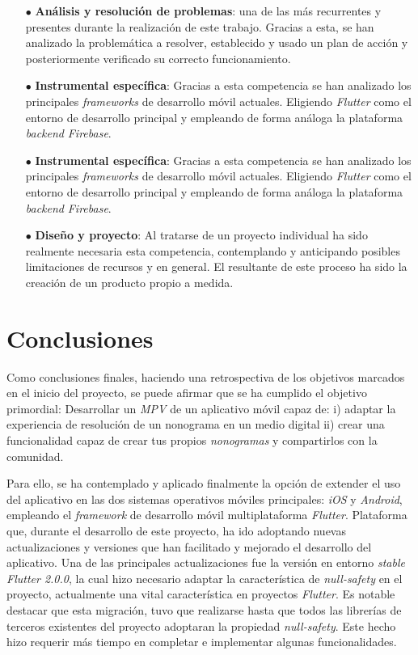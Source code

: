 \begin{itemize}
    \item[$\bullet$] \textbf{Análisis y resolución de problemas}: una de las
    más recurrentes y presentes durante la realización de este trabajo. Gracias a esta, se han
    analizado la problemática a resolver, establecido y usado un plan de acción y posteriormente
    verificado su correcto funcionamiento.
    \item[$\bullet$] \textbf{Instrumental específica}: Gracias a esta competencia
    se han analizado los principales \textit{frameworks} de desarrollo móvil actuales. 
    Eligiendo \textit{Flutter} como el entorno de desarrollo principal y empleando de forma
    análoga la plataforma \textit{back\-end} \textit{Firebase}.
    \item[$\bullet$] \textbf{Instrumental específica}: Gracias a esta competencia
    se han analizado los principales \textit{frameworks} de desarrollo móvil actuales. 
    Eligiendo \textit{Flutter} como el entorno de desarrollo principal y empleando de forma
    análoga la plataforma \textit{back\-end} \textit{Firebase}.
    \item[$\bullet$] \textbf{Diseño y proyecto}: Al tratarse de un proyecto individual
    ha sido realmente necesaria esta competencia, contemplando y anticipando
    posibles limitaciones de recursos y en general. El resultante de este proceso
    ha sido la creación de un producto propio a medida.
\end{itemize}

\section{Conclusiones}
Como conclusiones finales, haciendo una retrospectiva de los objetivos
marcados en el inicio del proyecto, se puede afirmar que se ha cumplido
 el objetivo primordial: Desarrollar un \textit{MPV} de un aplicativo móvil capaz de:
i) adaptar la experiencia de resolución de un nonograma en un medio digital
ii) crear una funcionalidad capaz de crear tus propios \textit{nonogramas} y
compartirlos con la comunidad.

Para ello, se ha contemplado y aplicado finalmente la opción de extender el uso 
del aplicativo en las dos sistemas operativos móviles principales: \textit{iOS}
y \textit{Android}, empleando el \textit{framework} de desarrollo móvil
multiplataforma \textit{Flutter}. Plataforma que, durante el desarrollo de
este proyecto, ha ido adoptando nuevas actualizaciones y versiones que han
facilitado y mejorado el desarrollo del aplicativo. Una de las
principales actualizaciones fue la versión en entorno \textit{stable} \textit{Flutter 2.0.0}, 
la cual hizo necesario adaptar la característica de \textit{null-safety} en el proyecto,
actualmente una vital característica en proyectos \textit{Flutter}. Es notable 
destacar que esta migración, tuvo que realizarse hasta que todos las librerías de terceros
existentes del proyecto adoptaran la propiedad \textit{null-safety}. Este hecho hizo
requerir más tiempo en completar e implementar algunas funcionalidades.

